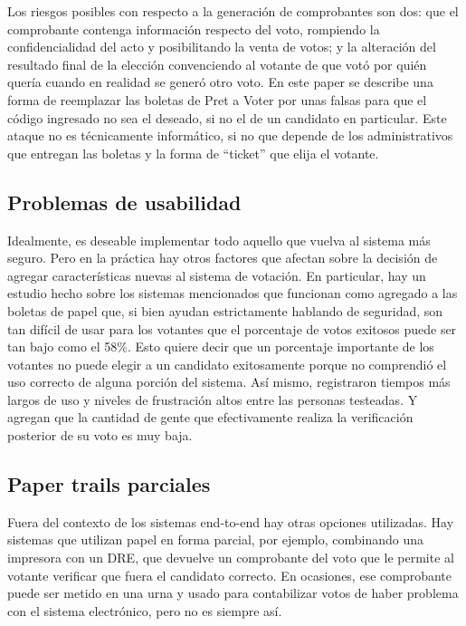 Los riesgos posibles con respecto a la generación de comprobantes son dos: que el comprobante contenga información respecto del voto, rompiendo la confidencialidad del acto y posibilitando la venta de votos; y la alteración del resultado final de la elección convenciendo al votante de que votó por quién quería cuando en realidad se generó otro voto.
En este paper\cite{kelsey} se describe una forma de reemplazar las boletas de Pret a Voter por unas falsas para que el código ingresado no sea el deseado, si no el de un candidato en particular. Este ataque no es técnicamente informático, si no que depende de los administrativos que entregan las boletas y la forma de “ticket” que elija el votante.\\



\subsection{Problemas de usabilidad}

Idealmente, es deseable implementar todo aquello que vuelva al sistema más seguro. Pero en la práctica hay otros factores que afectan sobre la decisión de agregar características nuevas al sistema de votación. En particular, hay un estudio hecho sobre los sistemas mencionados que funcionan como agregado a las boletas de papel que, si bien ayudan estrictamente hablando de seguridad, son tan difícil de usar para los votantes que el porcentaje de votos exitosos puede ser tan bajo como el 58\%\cite{usability}. Esto quiere decir que un porcentaje importante de los votantes no puede elegir a un candidato exitosamente porque no comprendió el uso correcto de alguna porción del sistema. Así mismo, registraron tiempos más largos de uso y niveles de frustración altos entre las personas testeadas. Y agregan que la cantidad de gente que efectivamente realiza la verificación posterior de su voto es muy baja.

\subsection{Paper trails parciales}

Fuera del contexto de los sistemas end-to-end hay otras opciones utilizadas. Hay sistemas que utilizan papel en forma parcial, por ejemplo, combinando una impresora con un DRE, que devuelve un comprobante del voto que le permite al votante verificar que fuera el candidato correcto. En ocasiones, ese comprobante puede ser metido en una urna y usado para contabilizar votos de haber problema con el sistema electrónico, pero no es siempre así.

